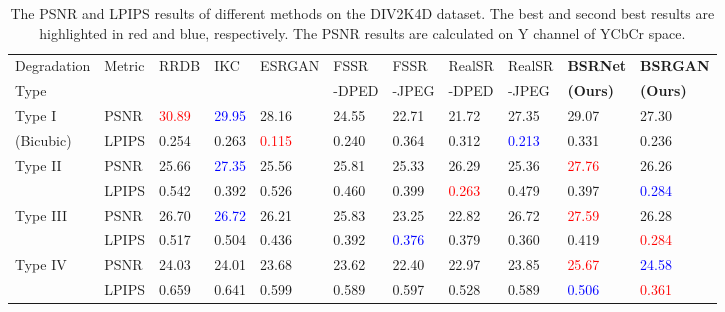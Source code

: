 \documentclass[10pt,twocolumn,letterpaper]{article}
\begin{document}
\begin{table*}[!htbp]\footnotesize
\caption{The PSNR and LPIPS results of different methods on the DIV2K4D dataset. The best and second best results are highlighted in red and blue, respectively. The PSNR results are calculated on Y channel of YCbCr space.}
\vspace{-0.2cm}
\center
\begin{tabular}{p{1.5cm}<{\centering}|p{1.0cm}<{\centering}||p{1.0cm}<{\centering}|p{0.9cm}<{\centering}|p{1.2cm}<{\centering}|p{1.2cm}<{\centering}|p{1.1cm}<{\centering}|p{1.1cm}<{\centering}|p{1.1cm}<{\centering}||p{1.2cm}<{\centering}|p{1.2cm}<{\centering}}
\hline
Degradation   & \multirow{2}{*}{Metric} & \multirow{2}{*}{RRDB}& \multirow{2}{*}{IKC}   & \multirow{2}{*}{ESRGAN}  & FSSR  & FSSR & RealSR  &  RealSR & \textbf{BSRNet} & \textbf{BSRGAN}  \\
 Type &  &  &  &   & -DPED  & -JPEG  & -DPED  & -JPEG & \textbf{(Ours)} & \textbf{(Ours)}  \\ \hline\hline

Type I  & PSNR & \textcolor{red}{30.89} &  \textcolor{blue}{29.95}  & 28.16  & 24.55  & 22.71 & 21.72  & 27.35 & {{29.07}} & 27.30  \\
   (Bicubic)                       & LPIPS & 0.254 & 0.263 & \textcolor{red}{0.115}  & 0.240 & 0.364  & 0.312  &  \textcolor{blue}{0.213}& 0.331   & 0.236  \\ \hline


\multirow{2}{*}{Type II}   & PSNR & 25.66 & \textcolor{blue}{27.35}  & 25.56  & 25.81  & 25.33 & 26.29  & 25.36 & \textcolor{red}{27.76} & 26.26  \\
                          & LPIPS & 0.542 & 0.392 & 0.526  & 0.460 & 0.399  & \textcolor{red}{0.263}  & 0.479& 0.397   & \textcolor{blue}{{0.284}}  \\ \hline

\multirow{2}{*}{Type III}   & PSNR & 26.70 & \textcolor{blue}{26.72}  & 26.21  & 25.83  & 23.25  & 22.82  & 26.72  & \textcolor{red}{27.59}& 26.28  \\
                          & LPIPS & 0.517 & 0.504  & 0.436  & 0.392  & \textcolor{blue}{{0.376}}  & 0.379  & 0.360  & 0.419& \textcolor{red}{0.284}  \\ \hline

\multirow{2}{*}{Type IV}   & PSNR & 24.03 & 24.01 & 23.68  & 23.62  & 22.40 & 22.97  & 23.85 & \textcolor{red}{25.67}  & \textcolor{blue}{24.58}  \\
                          & LPIPS & 0.659 & 0.641  & 0.599  &  0.589 & 0.597  &  0.528 & 0.589 & \textcolor{blue}{0.506} & \textcolor{red}{0.361}  \\ \hline

\end{tabular}
\label{table:div2k4d}
\end{table*}
\end{document}
